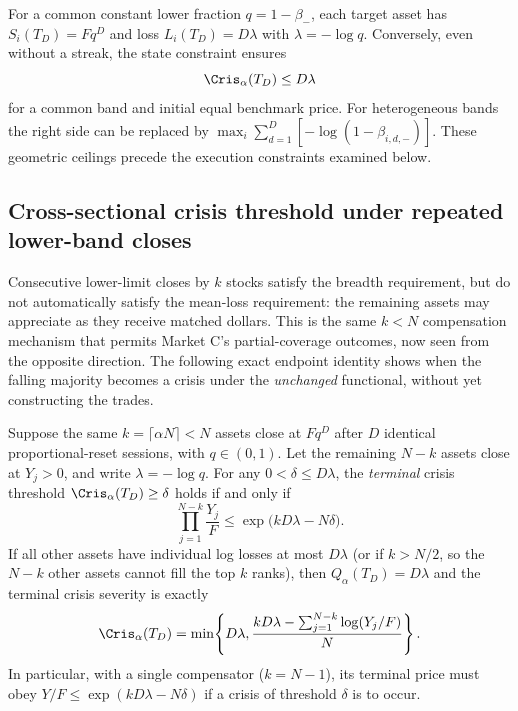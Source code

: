 \documentclass[review,hidelinks,onefignum,onetabnum]{siamonline250211}
\begin{document}
For a common constant lower fraction $q=1-\beta_-$, each target asset has
$S_i(T_D)=Fq^D$ and loss $L_i(T_D)=D\lambda$ with $\lambda=-\log q$. Conversely, even without a streak, the state constraint ensures
\begin{equation}\label{eq:rolling-cumulative-upper}
  \Cris_\alpha(T_D)\le D\lambda
\end{equation}
for a common band and initial equal benchmark price. For heterogeneous bands the right side can be replaced by
$\max_i\sum_{d=1}^D[-\log(1-\beta_{i,d,-})]$. These geometric ceilings precede the execution constraints examined below.


\subsection{Cross-sectional crisis threshold under repeated lower-band closes}\label{subsec:multiday-breadth}
Consecutive lower-limit closes by $k$ stocks satisfy the breadth requirement, but do not automatically satisfy the mean-loss requirement: the remaining assets may appreciate as they receive matched dollars. This is the same $k<N$ compensation mechanism that permits Market C's partial-coverage outcomes, now seen from the opposite direction. The following exact endpoint identity shows when the falling majority becomes a crisis under the \emph{unchanged} functional, without yet constructing the trades.
\begin{proposition}\label{prop:multiday-crisis-trigger}
Suppose the same $k=\lceil\alpha N\rceil<N$ assets close at $Fq^D$ after $D$ identical proportional-reset sessions, with $q\in(0,1)$. Let the remaining $N-k$ assets close at $Y_j>0$, and write $\lambda=-\log q$. For any $0<\delta\le D\lambda$, the \emph{terminal} crisis threshold $\Cris_\alpha(T_D)\ge\delta$ holds if and only if
\begin{equation}\label{eq:multiday-trigger-product}
\qquad \prod_{j=1}^{N-k}\frac{Y_j}{F}
 \le\exp\bigl(kD\lambda-N\delta\bigr).\qquad
\end{equation}
If all other assets have individual log losses at most $D\lambda$ (or if $k>N/2$, so the $N-k$ other assets cannot fill the top $k$ ranks), then $Q_\alpha(T_D)=D\lambda$ and the terminal crisis severity is exactly
\begin{equation}\label{eq:multiday-trigger-exact}
\quad\Cris_\alpha(T_D)=\min\!\left\{D\lambda,
 \frac{kD\lambda-\sum_{j=1}^{N-k}\log(Y_j/F)}{N}\right\}.\quad
\end{equation}
In particular, with a single compensator ($k=N-1$), its terminal price must obey $Y/F\le\exp(kD\lambda-N\delta)$ if a crisis of threshold $\delta$ is to occur.
\end{proposition}
\end{document}
